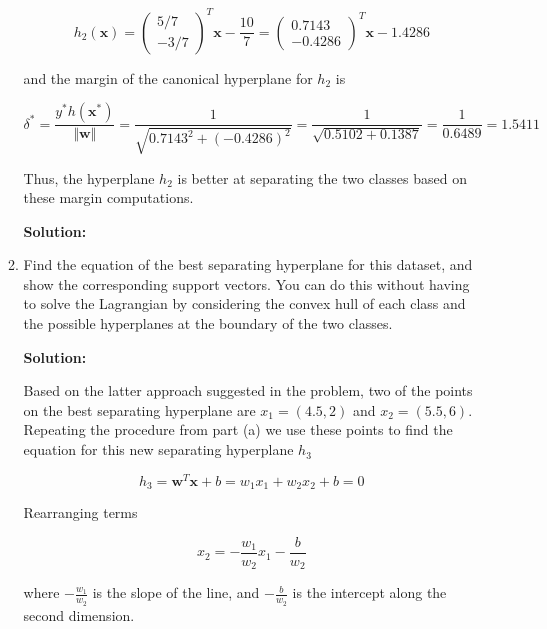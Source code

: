 \documentclass[11pt]{article}
\begin{document}
\begin{enumerate}
\begin{enumerate}
\begin{equation*}
h_2(\mathbf{x})
=
\left(\begin{array}{c}
5/7 \\ -3/7
\end{array}\right)^\mathit{T} \mathbf{x} - \frac{10}{7}
=
\left(\begin{array}{c}
0.7143 \\ -0.4286
\end{array}\right)^\mathit{T} \mathbf{x} - 1.4286
\end{equation*}

and the margin of the canonical hyperplane for $h_2$ is

\begin{equation*}
\delta^*
=
\frac{y^*h(\mathbf{x}^*)}{\Vert \mathbf{w} \Vert}
=
\frac{1}{\sqrt{0.7143^2 + (-0.4286)^2}}
=
\frac{1}{\sqrt{0.5102 + 0.1387}}
=
\frac{1}{0.6489}
=
1.5411
\end{equation*}

Thus, the hyperplane $h_2$ is better at separating the two classes based on these margin computations.

\textbf{Solution:}

\item Find the equation of the best separating hyperplane for this dataset, and show the corresponding support vectors. You can do this without having to solve the Lagrangian by considering the convex hull of each class and the possible hyperplanes at the boundary of the two classes.

\textbf{Solution:}

Based on the latter approach suggested in the problem, two of the points on the best separating hyperplane are $x_1 = (4.5, 2)$ and $x_2 = (5.5, 6)$. Repeating the procedure from part (a) we use these points to find the equation for this new separating hyperplane $h_3$

\begin{equation*}
h_3 = \mathbf{w}^\mathit{T} \mathbf{x} + b = w_1 x_1 + w_2 x_2 + b = 0
\end{equation*}

Rearranging terms

\begin{equation*}
x_2 = - \frac{w_1}{w_2} x_1 - \frac{b}{w_2}
\end{equation*}

where $- \frac{w_1}{w_2}$ is the slope of the line, and $- \frac{b}{w_2}$ is the intercept along the second dimension.


\end{enumerate}
\end{enumerate}
\end{document}
